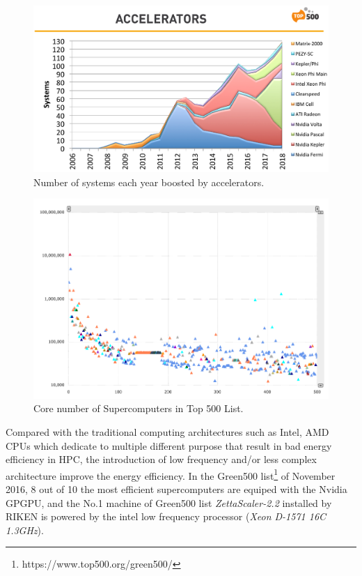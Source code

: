 \begin{figure}[htbp]
	\centering
	\includegraphics[width=6.2in]{fig/top500.pdf}
	\caption{Number of systems each year boosted by accelerators.}
	\label{top500-acc}
\end{figure}

\begin{figure}[htbp]
	\centering
	\includegraphics[width=5.6in]{fig/core_nb.pdf}
	\caption{Core number of Supercomputers in Top 500 List.}
	\label{core-nb}
\end{figure}

Compared with the traditional computing architectures such as Intel, AMD CPUs which dedicate to multiple different purpose that result in bad energy efficiency in HPC, the introduction of low frequency and/or less complex architecture improve the energy efficiency. In the Green500 list\footnote{https://www.top500.org/green500/} of November 2016, 8 out of 10 the most efficient supercomputers are equiped with the Nvidia GPGPU, and the No.1 machine of Green500 list \textit{ZettaScaler-2.2} installed by RIKEN is powered by the intel low frequency processor (\textit{Xeon D-1571 16C 1.3GHz}).

